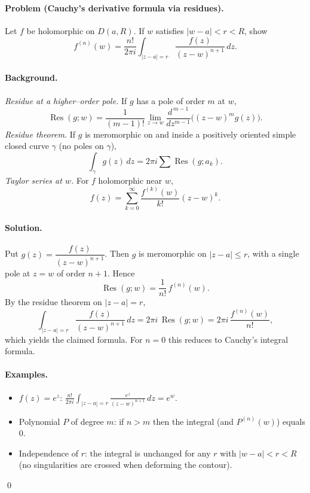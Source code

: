 \documentclass[11pt,a4paper]{article}
\theoremstyle{definition}
\theoremstyle{definition}
\theoremstyle{plain}
\theoremstyle{remark}
\begin{document}
\paragraph{Problem (Cauchy’s derivative formula via residues).}
Let $f$ be holomorphic on $D(a,R)$. If $w$ satisfies $|w-a|<r<R$, show
\[
f^{(n)}(w)=\frac{n!}{2\pi i}\int_{|z-a|=r}\frac{f(z)}{(z-w)^{n+1}}\,dz.
\]

\paragraph{Background.}
\emph{Residue at a higher–order pole.}
If $g$ has a pole of order $m$ at $w$,
\[
\operatorname{Res}(g;w)=\frac{1}{(m-1)!}\lim_{z\to w}\frac{d^{\,m-1}}{dz^{m-1}}\Big((z-w)^m g(z)\Big).
\]
\emph{Residue theorem.}
If $g$ is meromorphic on and inside a positively oriented simple closed curve $\gamma$ (no poles on $\gamma$),
\[
\int_\gamma g(z)\,dz=2\pi i\sum \operatorname{Res}(g;a_k).
\]
\emph{Taylor series at $w$.}
For $f$ holomorphic near $w$,
\[
f(z)=\sum_{k=0}^{\infty}\frac{f^{(k)}(w)}{k!}(z-w)^k .
\]

\medskip
\paragraph{Solution.}
Put $g(z)=\dfrac{f(z)}{(z-w)^{n+1}}$. Then $g$ is meromorphic on $|z-a|\le r$, with a single pole at $z=w$ of order $n+1$.
Hence
\[
\operatorname{Res}(g;w)=\frac{1}{n!}\,f^{(n)}(w).
\]
By the residue theorem on $|z-a|=r$,
\[
\int_{|z-a|=r}\frac{f(z)}{(z-w)^{n+1}}\,dz
= 2\pi i\,\operatorname{Res}(g;w)
= 2\pi i\,\frac{f^{(n)}(w)}{n!},
\]
which yields the claimed formula. For $n=0$ this reduces to Cauchy’s integral formula.

\medskip
\paragraph{Examples.}
\begin{itemize}
	\item $f(z)=e^{z}$: $\displaystyle \frac{n!}{2\pi i}\int_{|z-a|=r}\frac{e^{z}}{(z-w)^{n+1}}\,dz=e^{w}$.
	\item Polynomial $P$ of degree $m$: if $n>m$ then the integral (and $P^{(n)}(w)$) equals $0$.
	\item Independence of $r$: the integral is unchanged for any $r$ with $|w-a|<r<R$ (no singularities are crossed when deforming the contour).
\end{itemize}
\qed
\end{document}
